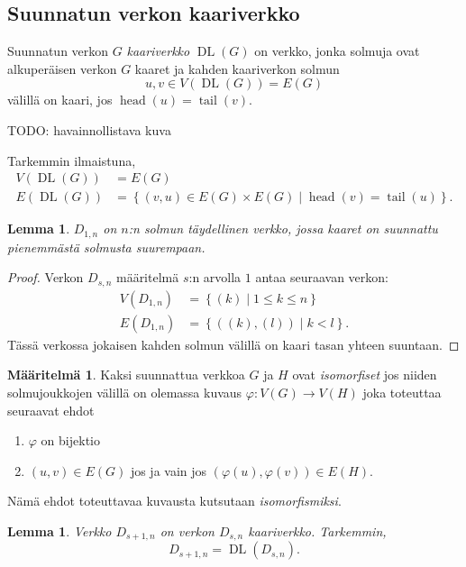 \documentclass[finnish]{tktltiki2}
\newtheorem{lem}[lau]{Lemma}
\theoremstyle{definition}
\newtheorem{maar}[lau]{Määritelmä}
\theoremstyle{remark}
\newcommand{\set}[1]{\left\{ #1 \right\}}
\newcommand{\from}{\colon}
\DeclareMathOperator{\head}{head}
\DeclareMathOperator{\tail}{tail}
\DeclareMathOperator{\DL}{DL}
\newcommand{\Dsn}{D_{s,n}}
\newcommand{\Dssn}{D_{s+1,n}}
\begin{document}
\subsection{Suunnatun verkon kaariverkko}

Suunnatun verkon $G$ \emph{kaariverkko} $\DL(G)$ on verkko, jonka solmuja ovat
alkuperäisen verkon $G$ kaaret ja kahden kaariverkon solmun
%
\begin{equation*}
    u,v \in V(\DL(G)) = E(G)
\end{equation*}
%
välillä on kaari, jos $\head(u) = \tail(v)$.

TODO: havainnollistava kuva

Tarkemmin ilmaistuna,
%
\begin{align*}
    V(\DL(G)) &= E(G) \\
    E(\DL(G)) &= \set{(v,u) \in E(G) \times E(G) \mid \head(v) = \tail(u)}.
\end{align*}


\begin{lem}
    $D_{1,n}$ on $n$:n solmun täydellinen verkko, jossa kaaret on suunnattu
    pienemmästä solmusta suurempaan.
\end{lem}

\begin{proof}
    Verkon $\Dsn$ määritelmä $s$:n arvolla $1$ antaa seuraavan verkon:
    \begin{align*}
        V(D_{1,n}) &= \set{(k) \mid 1 \leq k \leq n} \\
        E(D_{1,n}) &= \set{((k), (l)) \mid k < l}.
    \end{align*}
    Tässä verkossa jokaisen kahden solmun välillä on kaari tasan yhteen
    suuntaan.
\end{proof}

\begin{maar}
    Kaksi suunnattua verkkoa $G$ ja $H$ ovat \emph{isomorfiset} jos niiden
    solmujoukkojen välillä on olemassa kuvaus $\varphi \from V(G) \to V(H)$
    joka toteuttaa seuraavat ehdot
    \begin{enumerate}
        \item $\varphi$ on bijektio
        \item $(u,v) \in E(G)$ jos ja vain jos $(\varphi(u), \varphi(v)) \in
            E(H)$.
    \end{enumerate}
    Nämä ehdot toteuttavaa kuvausta kutsutaan \emph{isomorfismiksi}.
\end{maar}

\begin{lem}
    Verkko $\Dssn$ on verkon $\Dsn$ kaariverkko. Tarkemmin,
    \begin{equation*}
        \Dssn = \DL(\Dsn).
    \end{equation*}
\end{lem}
\end{document}
